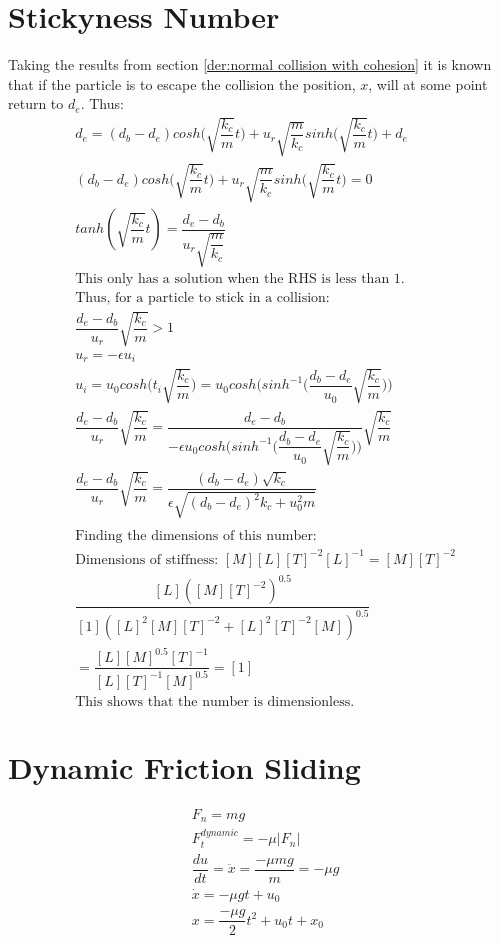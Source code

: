 \documentclass[10pt,a4paper,titlepage]{report}
\begin{document}
\section{Stickyness Number}
Taking the results from section \ref{der:normal collision with cohesion} it is known that if the particle is to escape the collision the position, $x$, will at some point return to $d_e$. Thus:
\begin{align*}
&d_e = (d_b - d_e)cosh\Big(\sqrt{\dfrac{k_c}{m}} t\Big) + u_r \sqrt{\dfrac{m}{k_c}} sinh\Big(\sqrt{\dfrac{k_c}{m}}t\Big) + d_e \\
&(d_b - d_e)cosh\Big(\sqrt{\dfrac{k_c}{m}} t\Big) + u_r \sqrt{\dfrac{m}{k_c}} sinh\Big(\sqrt{\dfrac{k_c}{m}}t\Big) = 0 \\
&tanh(\sqrt{\dfrac{k_c}{m}} t) = \dfrac{d_e - d_b}{u_r \sqrt{\dfrac{m}{k_c}}} \\
&\text{This only has a solution when the RHS is less than 1.} \\
&\text{Thus, for a particle to stick in a collision:} \\
&\dfrac{d_e - d_b}{u_r}\sqrt{\dfrac{k_c}{m}} > 1 \\
&u_r = -\epsilon u_i \\
&u_i = u_0 cosh\Big(t_i \sqrt{\dfrac{k_c}{m}}\Big) = u_0 cosh\Big(sinh^{-1}\Big(\dfrac{d_b - d_e}{u_0}\sqrt{\dfrac{k_c}{m}}\Big)\Big) \\
&\dfrac{d_e - d_b}{u_r}\sqrt{\dfrac{k_c}{m}} = \dfrac{d_e - d_b}{-\epsilon u_0 cosh\Big(sinh^{-1}\Big(\dfrac{d_b - d_e}{u_0}\sqrt{\dfrac{k_c}{m}}\Big)\Big)}\sqrt{\dfrac{k_c}{m}} \\
&\dfrac{d_e - d_b}{u_r}\sqrt{\dfrac{k_c}{m}} = \dfrac{(d_b - d_e)\sqrt{k_c}}{\epsilon \sqrt{(d_b - d_e)^2 k_c + u_0 ^ 2 m}} \\\\
&\text{Finding the dimensions of this number:} \\
&\text{Dimensions of stiffness: } [M][L][T]^{-2}[L]^{-1} = [M][T]^{-2} \\
&\dfrac{[L]([M][T]^{-2})^{0.5}}{[1]([L]^2[M][T]^{-2} + [L]^2[T]^{-2}[M])^{0.5}} \\
& = \dfrac{[L][M]^{0.5}[T]^{-1}}{[L][T]^{-1}[M]^{0.5}} = [1] \\
&\text{This shows that the number is dimensionless.}
\end{align*}
\section{Dynamic Friction Sliding}
\begin{align*}
&F_n = mg \\
&F_t^{dynamic} = - \mu |F_n| \\
&\dfrac{du}{dt} = \ddot{x} = \dfrac{- \mu m g}{m} = - \mu g\\
&\dot{x} = - \mu g t + u_0 \\
&x = \dfrac{- \mu g}{2}t^2 + u_0 t + x_0 \\
\end{align*}
\end{document}
